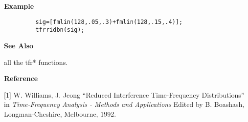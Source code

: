 {\bf \large \sf Example}
\begin{verbatim}
         sig=[fmlin(128,.05,.3)+fmlin(128,.15,.4)]; 
         tfrridbn(sig); 
\end{verbatim}
\vspace*{.5cm}


{\bf \large \sf See Also}\\
\hspace*{1.5cm}
\begin{minipage}[t]{13.5cm}
all the {\ty tfr*} functions.
\end{minipage}
\vspace*{.5cm}


{\bf \large \sf Reference}\\
\hspace*{1.5cm}
\begin{minipage}[t]{13.5cm}
[1] W. Williams, J. Jeong ``Reduced Interference Time-Frequency
Distributions'' in {\it Time-Frequency Analysis - Methods and
Applications} Edited by B. Boashash, Longman-Cheshire, Melbourne, 1992.
\end{minipage}


